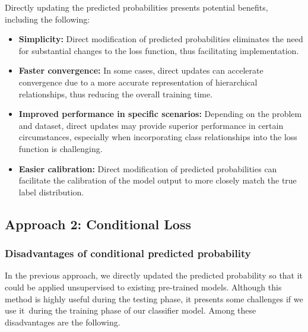 Directly updating the predicted probabilities presents potential benefits, including the following:

\begin{itemize}

    \item  \textbf{Simplicity:} Direct modification of predicted probabilities eliminates the need for substantial changes to the loss function, thus facilitating implementation.

    \item  \textbf{Faster convergence:} In some cases, direct updates can accelerate convergence due to a more accurate representation of hierarchical relationships, thus reducing the overall training time.

    \item  \textbf{Improved performance in specific scenarios:} Depending on the problem and dataset, direct updates may provide superior performance in certain circumstances, especially when incorporating class relationships into the loss function is challenging.

    \item  \textbf{Easier calibration:} Direct modification of predicted probabilities can facilitate the calibration of the model output to more closely match the true label distribution.

\end{itemize}


\subsection{Approach 2: Conditional Loss}

\subsubsection{Disadvantages of conditional predicted probability}

In the previous approach, we directly updated the predicted probability so that it could be applied unsupervised to existing pre-trained models. Although this method is highly useful during the testing phase, it presents some challenges if we use it~during the training phase of our classifier model. Among these disadvantages are the following.

